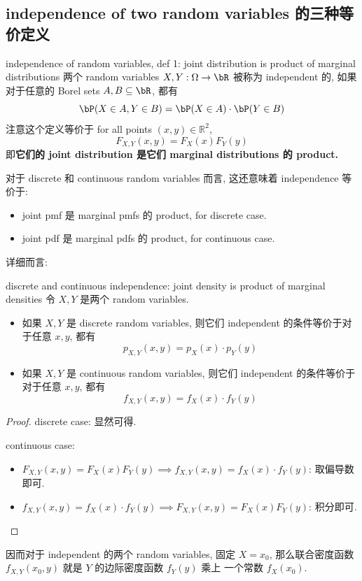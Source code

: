 \subsection{independence of two random variables 的三种等价定义}
\begin{definition}{independence of random variables, def 1: joint distribution is product of marginal distributions}
    两个 random variables \(X, Y: \Omega \to \bR\) 被称为 independent 的, 
    如果对于任意的 Borel sets \(A, B \subseteq \bR\), 都有
    \[
    \bP(X \in A, Y \in B) = \bP(X \in A) \cdot \bP(Y \in B)
    \]
    注意这个定义等价于 for all points \((x, y) \in \mathbb{R}^2\),
    \[
    F_{X,Y}(x, y) = F_X(x) F_Y(y)   
    \]
    即\textbf{它们的 joint distribution 是它们 marginal distributions 的 product.}
\end{definition}
对于 discrete 和 continuous random variables 而言, 这还意味着 independence 等价于:
\begin{itemize}
        \item joint pmf 是 marginal pmfs 的 product, for discrete case.
        \item joint pdf 是 marginal pdfs 的 product, for continuous case.
\end{itemize}
详细而言: 
\begin{theorem}{discrete and continuous independence: joint density is product of marginal densities} \label{discrete and continuous case of independence: joint density is product of marginal densities}
    令 \(X, Y\) 是两个 random variables. 
    \begin{itemize}
        \item 如果 \(X, Y\) 是 discrete random variables, 
        则它们 independent 的条件等价于对于任意 \(x, y\), 都有
        \[
        p_{X,Y}(x, y) = p_X(x) \cdot p_Y(y)
        \]
        \item 如果 \(X, Y\) 是 continuous random variables, 则它们 independent 的条件等价于对于任意 \(x, y\), 都有
        \[
        f_{X,Y}(x, y) = f_X(x) \cdot f_Y(y)
        \]
    \end{itemize}
\end{theorem}
\begin{proof}
    discrete case: 显然可得.

    continuous case: 
    \begin{itemize}
        \item \(F_{X,Y}(x, y) = F_X(x) F_Y(y)  \implies f_{X,Y}(x, y) = f_X(x) \cdot f_Y(y)\): 取偏导数即可.
        \item \(f_{X,Y}(x, y) = f_X(x) \cdot f_Y(y) \implies F_{X,Y}(x, y) = F_X(x) F_Y(y)\): 积分即可.
    \end{itemize}
\end{proof}
因而对于 independent 的两个 
random variables, 固定 $X= x_0$, 那么联合密度函数
$f_{X,Y}(x_0, y)$ 就是 $Y$ 的边际密度函数 $f_Y(y)$ 乘上
一个常数 $f_X(x_0)$.\\



